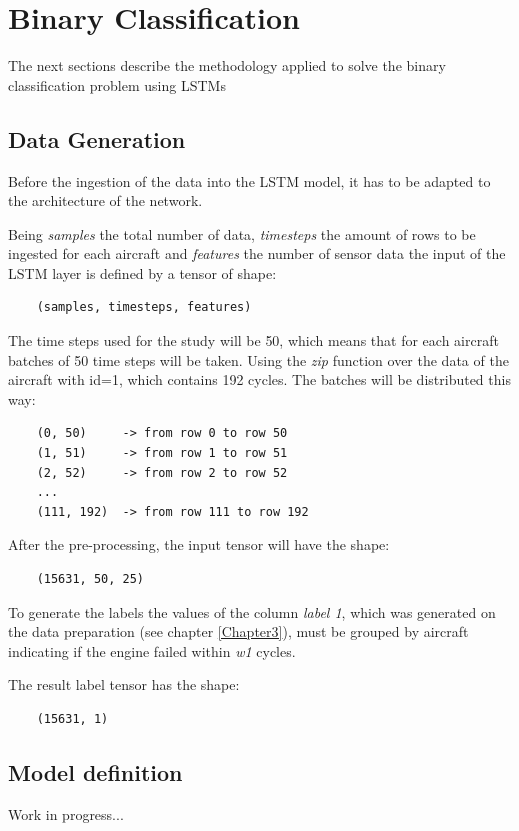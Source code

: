 \section{Binary Classification}

The next sections describe the methodology applied to solve the binary classification problem using LSTMs

\subsection{Data Generation}

Before the ingestion of the data into the LSTM model, it has to be adapted to the architecture of the network.

Being \textit{samples} the total number of data, \textit{timesteps} the amount of rows to be ingested for each aircraft and \textit{features} the number of sensor data the input of the LSTM layer is defined by a tensor of shape:

\begin{verbatim}
    (samples, timesteps, features)
\end{verbatim}

The time steps used for the study will be 50, which means that for each aircraft batches of 50 time steps will be taken.
Using the \textit{zip} function over the data of the aircraft with id=1, which contains 192 cycles. The batches will be distributed this way:

\begin{verbatim}
    (0, 50)     -> from row 0 to row 50
    (1, 51)     -> from row 1 to row 51
    (2, 52)     -> from row 2 to row 52
    ...
    (111, 192)  -> from row 111 to row 192
\end{verbatim}

After the pre-processing, the input tensor will have the shape:

\begin{verbatim}
    (15631, 50, 25)
\end{verbatim}

To generate the labels the values of the column \textit{label 1}, which was generated on the data preparation (see chapter \ref{Chapter3}), must be grouped by aircraft indicating if the engine failed within \textit{w1} cycles.

The result label tensor has the shape:

\begin{verbatim}
    (15631, 1)
\end{verbatim}


\subsection{Model definition}

Work in progress...